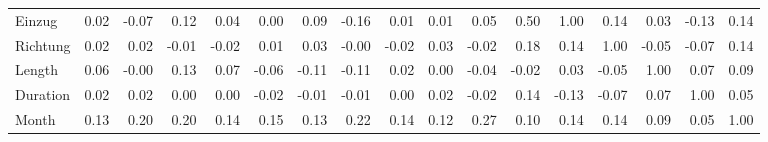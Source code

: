 \begin{tabular}{lrrrrrrrrrrrrrrrr}
Einzug        &  0.02 & -0.07 &  0.12 &  0.04 &   0.00 &   0.09 & -0.16 &   0.01 &   0.01 &  0.05 &           0.50 &    1.00 &      0.14 &    0.03 &     -0.13 &   0.14 \\
Richtung      &  0.02 &  0.02 & -0.01 & -0.02 &   0.01 &   0.03 & -0.00 &  -0.02 &   0.03 & -0.02 &           0.18 &    0.14 &      1.00 &   -0.05 &     -0.07 &   0.14 \\
Length        &  0.06 & -0.00 &  0.13 &  0.07 &  -0.06 &  -0.11 & -0.11 &   0.02 &   0.00 & -0.04 &          -0.02 &    0.03 &     -0.05 &    1.00 &      0.07 &   0.09 \\
Duration      &  0.02 &  0.02 &  0.00 &  0.00 &  -0.02 &  -0.01 & -0.01 &   0.00 &   0.02 & -0.02 &           0.14 &   -0.13 &     -0.07 &    0.07 &      1.00 &   0.05 \\
Month         &  0.13 &  0.20 &  0.20 &  0.14 &   0.15 &   0.13 &  0.22 &   0.14 &   0.12 &  0.27 &           0.10 &    0.14 &      0.14 &    0.09 &      0.05 &   1.00 \\
\bottomrule
\end{tabular}
